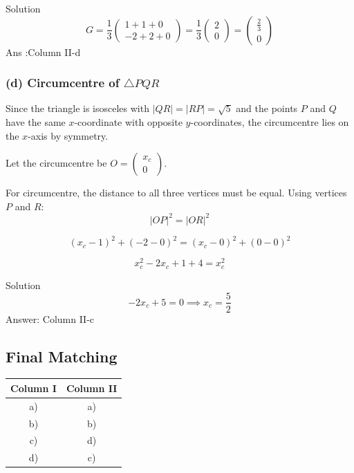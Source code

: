 \documentclass{beamer}
\newcommand{\myvec}[1]{\ensuremath{\begin{pmatrix}#1\end{pmatrix}}}
\begin{document}
\begin{frame}{Solution}
\begin{equation}
	G = \frac{1}{3}\myvec{1 + 1 + 0\\-2 + 2 + 0} = \frac{1}{3}\myvec{2\\0} = \myvec{\frac{2}{3}\\0}
\end{equation}
Ans :Column II-d

\subsubsection*{(d) Circumcentre of $\triangle PQR$}
Since the triangle is isosceles with $|QR| = |RP| = \sqrt{5}$ and the points $P$ and $Q$ have the same $x$-coordinate with opposite $y$-coordinates, the circumcentre lies on the $x$-axis by symmetry.

Let the circumcentre be $O = \myvec{x_c\\0}$.

For circumcentre, the distance to all three vertices must be equal. Using vertices $P$ and $R$:
\begin{equation}
	|OP|^2 = |OR|^2
\end{equation}

\begin{equation}
	(x_c - 1)^2 + (-2 - 0)^2 = (x_c - 0)^2 + (0 - 0)^2
\end{equation}

\begin{equation}
	x_c^2 - 2x_c + 1 + 4 = x_c^2
\end{equation}
\end{frame}

\begin{frame}{Solution}
\begin{equation}
	-2x_c + 5 = 0 \implies x_c = \frac{5}{2}
\end{equation}
Answer: Column II-c

\subsection*{Final Matching}

\begin{center}
	\begin{tabular}{|c|c|}
		\hline
		\textbf{Column I} & \textbf{Column II} \\
		\hline
		a) & a) \\
		b) & b) \\
		c) & d) \\
		d) & c) \\
		\hline
	\end{tabular}
\end{center}

\end{frame}
\end{document}
